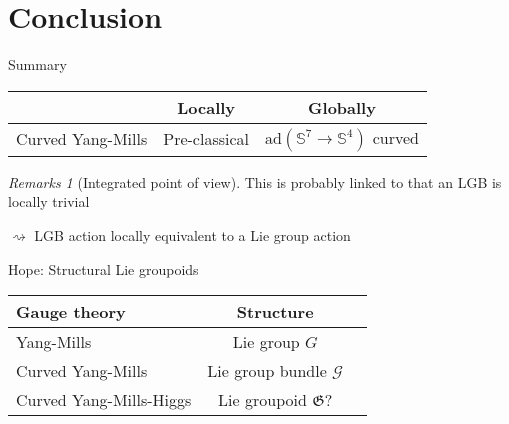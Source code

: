 \documentclass[hyperref={pdfpagelabels=false}]{beamer}
\theoremstyle{plain}
\theoremstyle{remark}
\newtheorem*{remark}{Remarks}
\begin{document}
\section{Conclusion}
{
\begin{frame}{Summary}
\begin{table}[h!]
		\begin{tabularx}{\textwidth}{X| c c} 
			\rowcolor{gray}
			& Locally & Globally \\ \hline
			Curved Yang-Mills & Pre-classical & $\mathrm{ad}(\mathds{S}^7 \to \mathds{S}^4)$ curved 
		\end{tabularx}
\end{table}
\begin{remark}[Integrated point of view]
This is probably linked to that an LGB is locally trivial 

$\rightsquigarrow$ LGB action locally equivalent to a Lie group action
\end{remark}

\end{frame}

\begin{frame}{Hope: Structural Lie groupoids}
\begin{table}[h!]
		\begin{tabularx}{\textwidth}{X| c c} 
			\rowcolor{gray}
			Gauge theory & Structure \\ \hline
			Yang-Mills & Lie group $G$ \\
			\rowcolor{Gray}
			Curved Yang-Mills & Lie group bundle $\mathcal{G}$ \\ 
			Curved Yang-Mills-Higgs & Lie groupoid $\mathfrak{G}$?
		\end{tabularx}
\end{table}


\end{frame}}
\end{document}
